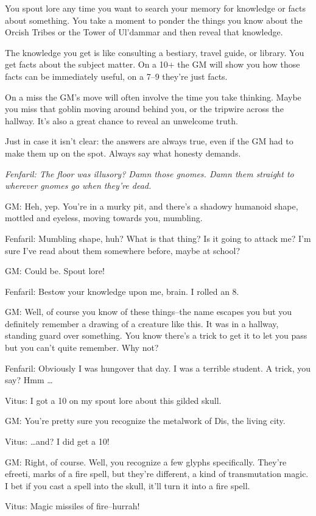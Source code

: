 You spout lore any time you want to search your memory for knowledge or facts about something. You take a moment to ponder the things you know about the Orcish Tribes or the Tower of Ul'dammar and then reveal that knowledge.

The knowledge you get is like consulting a bestiary, travel guide, or library. You get facts about the subject matter. On a 10+ the GM will show you how those facts can be immediately useful, on a 7--9 they're just facts.

On a miss the GM's move will often involve the time you take thinking. Maybe you miss that goblin moving around behind you, or the tripwire across the hallway. It's also a great chance to reveal an unwelcome truth.

Just in case it isn't clear: the answers are always true, even if the GM had to make them up on the spot. Always say what honesty demands.

{\itshape
Fenfaril: The floor was illusory? Damn those gnomes. Damn them straight to wherever gnomes go when they're dead.

GM: Heh, yep. You're in a murky pit, and there's a shadowy humanoid shape, mottled and eyeless, moving towards you, mumbling.

Fenfaril: Mumbling shape, huh? What is that thing? Is it going to attack me? I'm sure I've read about them somewhere before, maybe at school?

GM: Could be. Spout lore!

Fenfaril: Bestow your knowledge upon me, brain. I rolled an 8.

GM: Well, of course you know of these things--the name escapes you but you definitely remember a drawing of a creature like this. It was in a hallway, standing guard over something. You know there's a trick to get it to let you pass but you can't quite remember. Why not?

Fenfaril: Obviously I was hungover that day. I was a terrible student. A trick, you say? Hmm \ldots 

Vitus: I got a 10 on my spout lore about this gilded skull.

GM: You're pretty sure you recognize the metalwork of Dis, the living city.

Vitus:  \ldots and? I did get a 10!

GM: Right, of course. Well, you recognize a few glyphs specifically. They're efreeti, marks of a fire spell, but they're different, a kind of transmutation magic. I bet if you cast a spell into the skull, it'll turn it into a fire spell.

Vitus: Magic missiles of fire--hurrah!
}
